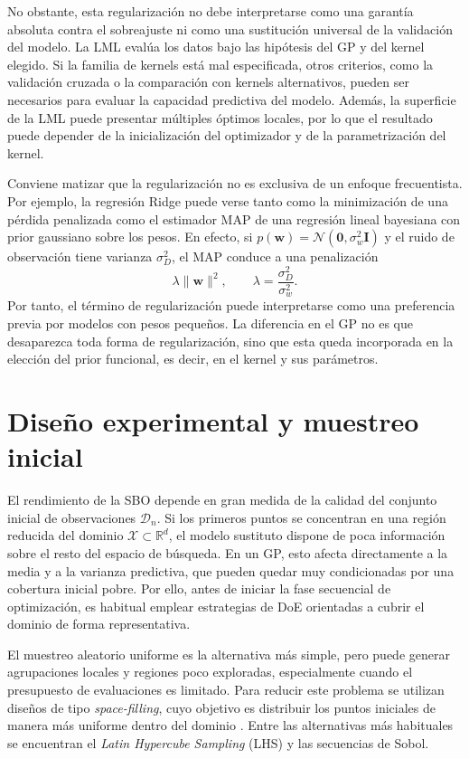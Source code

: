 No obstante, esta regularización no debe interpretarse como una garantía absoluta contra el
sobreajuste ni como una sustitución universal de la validación del modelo. La LML evalúa
los datos bajo las hipótesis del GP y del kernel elegido. Si la familia de kernels está mal
especificada, otros criterios, como la validación cruzada o la comparación con kernels
alternativos, pueden ser necesarios para evaluar la capacidad predictiva del modelo. Además,
la superficie de la LML puede presentar múltiples óptimos locales, por lo que el resultado
puede depender de la inicialización del optimizador y de la parametrización del kernel.

Conviene matizar que la regularización no es exclusiva de un enfoque
frecuentista. Por ejemplo, la regresión Ridge puede verse tanto como la minimización de una pérdida penalizada como el estimador MAP de una regresión lineal bayesiana con prior gaussiano sobre los pesos. En efecto, si
\(
p(\bm{w})=\mathcal{N}(\bm{0},\sigma_w^2\bm{I})
\)
y el ruido de observación tiene varianza \(\sigma_D^2\), el MAP conduce a una penalización
\[
\lambda\|\bm{w}\|^2,
\qquad
\lambda=\frac{\sigma_D^2}{\sigma_w^2}.
\]
Por tanto, el término de regularización puede interpretarse como una preferencia previa por modelos con pesos pequeños. La diferencia en el GP no es que desaparezca toda forma de regularización, sino que esta queda incorporada en la elección del prior funcional, es decir, en el kernel y sus parámetros.

\section{Diseño experimental y muestreo inicial}
\label{sec:muestreo_inicial}

El rendimiento de la SBO depende en gran
medida de la calidad del conjunto inicial de observaciones \(\mathcal{D}_n\). Si los primeros
puntos se concentran en una región reducida del dominio \(\mathcal{X}\subset\mathbb{R}^d\),
el modelo sustituto dispone de poca información sobre el resto del espacio de búsqueda. En
un GP, esto afecta directamente a la media y a la varianza predictiva, que
pueden quedar muy condicionadas por una cobertura inicial pobre. Por ello, antes de iniciar
la fase secuencial de optimización, es habitual emplear estrategias de DoE orientadas a cubrir el dominio de forma representativa.

El muestreo aleatorio uniforme es la alternativa más simple, pero puede generar agrupaciones
locales y regiones poco exploradas, especialmente cuando el presupuesto de evaluaciones es
limitado. Para reducir este problema se utilizan diseños de tipo \emph{space-filling}, cuyo
objetivo es distribuir los puntos iniciales de manera más uniforme dentro del dominio
\cite{forrester2008engineering}. Entre las alternativas más habituales se encuentran el
\emph{Latin Hypercube Sampling} (LHS) y las secuencias de Sobol.

